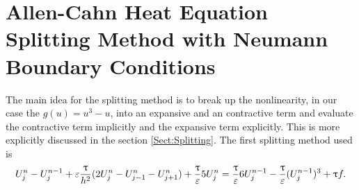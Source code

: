 \section{Allen-Cahn Heat Equation Splitting Method with Neumann Boundary Conditions} \label{Sect. Allen-Cahn Heat Equation Splitting Method with Neumann Boundary Conditions} 
The main idea for the splitting method is to break up the nonlinearity, in our case the $g(u) =u^3-u$, into an expansive and an contractive term and 
evaluate the contractive term implicitly and the expansive term explicitly. This is more explicitly discussed in the section \ref{Sect:Splitting}. The first splitting method used is 
\begin{eqnarray} \label{eqn. CahnAllenSplitting1}
U^{n}_j-U^{n-1}_j + \varepsilon \frac{ {\uptau}}{h^2}(2U^n_j-U^n_{j-1}-U^n_{j+1})+\frac{{\uptau}}{\varepsilon}5 U_j^{n}  =\frac{{\uptau}}{\varepsilon}6 U_j^{n-1}- \frac{{\uptau}}{\varepsilon}(U_j^{n-1})^3+{\uptau} f.
\end{eqnarray} 



